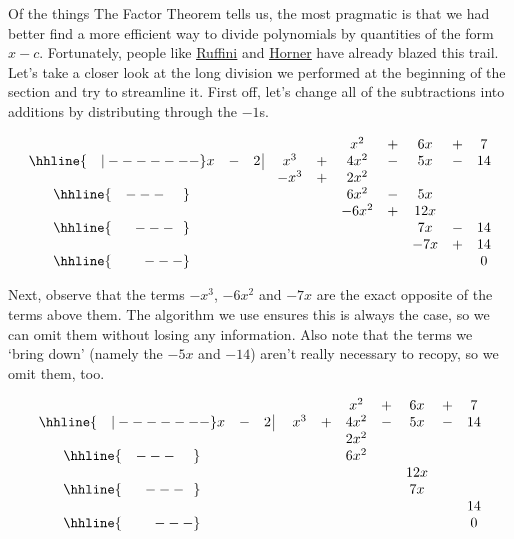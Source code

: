 Of the things The Factor Theorem tells us, the most pragmatic is that we had better find a more efficient way to divide polynomials by quantities of the form $x-c$.  Fortunately, people like \href{http://en.wikipedia.org/wiki/Synthetic_division}{\underline{Ruffini}} and \href{http://en.wikipedia.org/wiki/Horner_scheme}{\underline{Horner}} have already blazed this trail.  Let's take a closer look at the long division we performed at the beginning of the section and try to streamline it.  First off, let's change all of the subtractions into additions by distributing through the $-1$s.


\setlength\arraycolsep{0.1pt}
\setlength\extrarowheight{2pt}

\[ \begin{array}{cccccccccc}

& & & & & x^2 & + & 6x & + & 7 \\ \hhline{~~~|-------}

x & - & 2 \, \vline& x^3 & + & 4x^2 & - & 5x & - & 14 \\

 &  &  &  -x^3  & + &   2x^2 &  &  &  &  \\ \hhline{~~~---~~~~} 
 &  &  &   &  & 6 x^2 & - & 5x &  &  \\ 
 &  &  &   & &-6 x^2  & + &  12x &  &  \\ \hhline{~~~~~---~~} 
 &  &  &   &   &  & & 7x  & - & 14 \\
 &  &  &   &   &  & & - 7x  & + &  14  \\ \hhline{~~~~~~~---} 
 &   &  &  &  &  &  &  &  & 0
 
\end{array}\]

\setlength\arraycolsep{5pt}
\setlength\extrarowheight{0pt}


Next, observe that the terms $-x^3$, $-6x^2$ and $-7x$ are the exact opposite of the terms above them.  The algorithm we use ensures this is always the case, so we can omit them without losing any information. Also note that the terms we `bring down' (namely the $-5x$ and $-14$) aren't really necessary to recopy, so we omit them, too.


\setlength\arraycolsep{0.1pt}
\setlength\extrarowheight{2pt}

\[ \begin{array}{cccccccccc}

& & & & & x^2 & + & 6x & + & 7 \\ \hhline{~~~|-------}

x & - & 2 \, \vline& \, \, x^3 & + & 4x^2 & - & 5x & - & 14 \\

 &  &  &   &  &   2x^2 &  &  &  &  \\ \hhline{~~~---~~~~} 
 &  &  &   &  & 6 x^2 &  &  &  &  \\ 
 &  &  &   & &  &  &  12x &  &  \\ \hhline{~~~~~---~~} 
 &  &  &   &   &  & & 7x  &  &  \\
 &  &  &   &   &  & &   &  &  14  \\ \hhline{~~~~~~~---} 
 &   &  &  &  &  &  &  &  & 0
 
\end{array}\]

